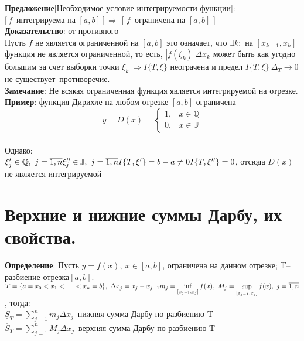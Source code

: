 \documentclass[a4paper,12pt]{article} %
\begin{document}
\noindent \textbf{Предложение}[Необходимое условие интегрируемости функции]:\\
$[ \,f$--интегрируема на $[a,b]~] \, \Rightarrow$ [ $f$--ограничена на $[a,b]$ ]\\
\noindent \textbf{Доказательство}: от противного\\
Пусть $f$ не является ограниченной на $[a,b]$ это означает, что $\exists k:$ на $[x_{k-1},x_k]$
функция не является ограниченной, то есть, $|f(\xi_k)|\Delta x_k$ может быть как угодно большим за счет выборки точки $\xi_k~\Rightarrow I\{T,\xi\}$ неограчена и предел $I\{T,\xi\}~\Delta_T\rightarrow 0$ не существует--противоречие.\\
\noindent \textbf{Замечание}: Не всякая ограниченная функция является интегрируемой на отрезке.\\
\noindent \textbf{Пример}: функция Дирихле на любом отрезке $[a,b]$ ограничена
$$y=D(x)=\left\{\begin{array}{ll}
1, & x \in \mathbb{Q} \\
0, & x \in \mathbb{J}
\end{array}\right.$$\\
Однако:\\
$\xi_j^{\prime} \in \mathbb{Q},~j = \overline{1,n}\\
\xi_j^{\prime \prime} \in \mathbb{J},~j = \overline{1,n}\\
I\{T,\xi^{\prime}\} = b-a\neq 0\\
I\{T,\xi^{\prime \prime}\} = 0$, отсюда $D(x)$ не является интегрируемой\\

\section*{Верхние и нижние суммы Дарбу, их свойства.}
\noindent \textbf{Определение}: Пусть $y = f(x),~x\in [a,b]$, ограничена на данном отрезке; T--разбиение отрезка$[a,b]$.\\
$ T = \{a = x_0 < x_1 < {\dots} < x_n = b\},~\Delta x_j = x_j - x_{j-1}\\
m_j = \inf\limits_{[x_{j-1},x_j]}f(x),~M_j = \sup\limits_{[x_{j-1},x_j]}f(x),~j = \overline{1,n}$, тогда:\\

$\underline{S}_T = \sum_{j = 1}^{n}{m_j \Delta x_j}$--нижняя сумма Дарбу по разбиению T\\

$\overline{S}_T = \sum_{j = 1}^{n}{M_j \Delta x_j}$--верхняя сумма Дарбу по разбиению T\\
\end{document}
